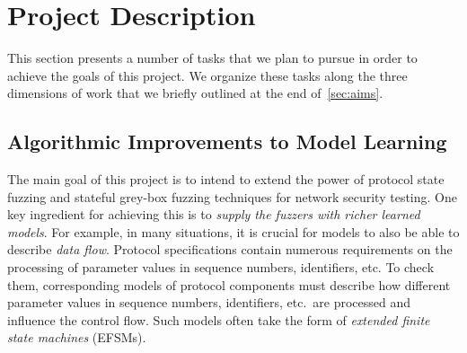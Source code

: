 \documentclass[11pt]{article}
\begin{document}
\section{Project Description} \label{sec:description}
This section presents a number of tasks that we plan to pursue in
order to achieve the goals of this project. We organize these tasks along the
three dimensions of work that we briefly outlined at the end of~\cref{sec:aims}.

\subsection{Algorithmic Improvements to Model Learning}
%
The main goal of this project is to intend to extend the power of protocol
state fuzzing and stateful grey-box fuzzing techniques for network security
testing.
One key ingredient for achieving this is to \emph{supply the fuzzers with
richer learned models}. For example, in many situations, it is crucial for
models to also be able to describe \emph{data flow}. Protocol specifications
contain numerous requirements on the processing of parameter values in
sequence numbers, identifiers, etc. To check them, corresponding models of
protocol components must describe how different parameter values in sequence
numbers, identifiers, etc.\ are processed and influence the control flow. Such
models often take the form of \emph{extended finite state machines} (EFSMs).
\end{document}
